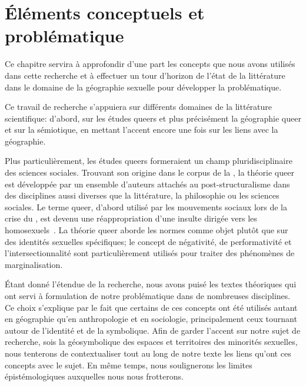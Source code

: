 \chapter{Éléments conceptuels et problématique}
\label{cha:elements_conceptuels_et_problematique}


Ce chapitre servira à approfondir d'une part les concepts que nous avons utilisés dans cette recherche et à effectuer un tour d'horizon de l'état de la littérature dans le domaine de la géographie sexuelle pour développer la problématique.


Ce travail de recherche s’appuiera sur différents domaines de la littérature scientifique: d'abord, sur les études queers et plus précisément la géographie queer et sur la sémiotique, en mettant l'accent encore une fois sur les liens avec la géographie.

Plus particulièrement, les études queers formeraient un champ pluridisciplinaire des sciences sociales.
Trouvant son origine dans le corpus de la , la théorie queer est développée par un ensemble d'auteurs attachés au post-structuralisme dans des disciplines aussi diverses que la littérature, la philosophie ou les sciences sociales.
Le terme queer, d'abord utilisé par les mouvements sociaux \lgbt{} lors de la crise du \vih{}, est devenu une réappropriation d'une insulte dirigée vers les homosexuels~\citep{Laprade2014}.
La théorie queer aborde les normes  comme objet plutôt que sur des identités sexuelles spécifiques; le concept de négativité, de performativité et l'intersectionnalité sont particulièrement utilisés pour traiter des phénomènes de marginalisation.

Étant donné l'étendue de la recherche, nous avons puisé les textes théoriques qui ont servi à formulation de notre problématique dans de nombreuses disciplines.
Ce choix s'explique par le fait que certains de ces concepts ont été utilisés autant en géographie qu'en anthropologie et en sociologie, principalement ceux tournant autour de l'identité et de la symbolique.
Afin de garder l’accent sur notre sujet de recherche, sois la géosymbolique des espaces et territoires des minorités sexuelles, nous tenterons de contextualiser tout au long de notre texte les liens qu'ont ces concepts avec le sujet.
En même temps, nous soulignerons les limites épistémologiques auxquelles nous nous frotterons.


